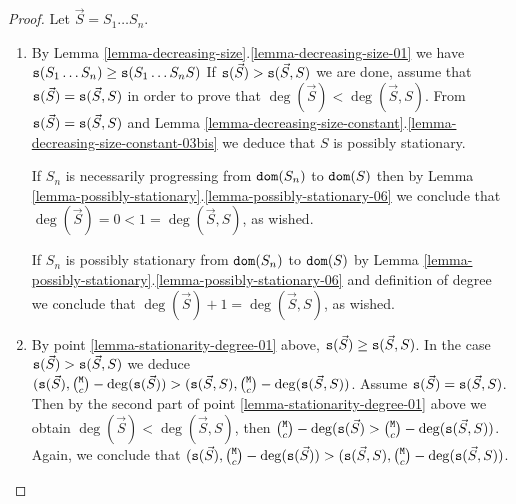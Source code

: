 \documentclass{lmcs}
\newtheorem{definition}[theorem]{Definition}
\begin{document}
\begin{proof}
Let $\vec{S} = S_1 \ldots S_n$.

\begin{enumerate}
\item
By Lemma \ref{lemma-decreasing-size}.\ref{lemma-decreasing-size-01}
we have ${\tt s}(S_1 \ldots S_n) \ge {\tt s}(S_1 \ldots S_n S)$ 
If ${\tt s}(\vec{S}) > {\tt s}(\vec{S},S)$ we are done, assume that 
${\tt s}(\vec{S}) = {\tt s}(\vec{S},S)$ in order to prove that $\deg(\vec{S}) < \deg(\vec{S},S)$.
From ${\tt s}(\vec{S}) = {\tt s}(\vec{S},S)$ and 
Lemma \ref{lemma-decreasing-size-constant}.\ref{lemma-decreasing-size-constant-03bis} 
we deduce that $S$ is possibly stationary. 

If $S_n$ is necessarily progressing from ${\tt dom}(S_n)$ to ${\tt dom}(S)$ then 
by Lemma \ref{lemma-possibly-stationary}.\ref{lemma-possibly-stationary-06}
we conclude that $\deg(\vec{S}) = 0 < 1 = \deg(\vec{S},S)$, as wished.

If $S_n$ is possibly stationary from ${\tt dom}(S_n)$ to ${\tt dom}(S)$ 
by Lemma \ref{lemma-possibly-stationary}.\ref{lemma-possibly-stationary-06}
and definition of degree we conclude that $\deg(\vec{S}) + 1 =  \deg(\vec{S},S)$, as wished.

\item
By point \ref{lemma-stationarity-degree-01} above, ${\tt s}(\vec{S}) \ge {\tt s}(\vec{S},S)$.
In the case ${\tt s}(\vec{S}) > {\tt s}(\vec{S},S)$ we deduce 
$
(\size(\vec{S}), \newton{\MaxInd}{c} - \deg(\size(\vec{S}))
>
(\size(\vec{S},S), \newton{\MaxInd}{c} - \deg(\size(\vec{S},S))
$.
Assume ${\tt s}(\vec{S}) = {\tt s}(\vec{S},S)$. Then by the second part of point 
\ref{lemma-stationarity-degree-01} above we obtain $\deg(\vec{S}) < \deg(\vec{S},S)$,
then $\newton{\MaxInd}{c} - \deg(\size(\vec{S}) > 
\newton{\MaxInd}{c} - \deg(\size(\vec{S},S))$. 
Again, we conclude that 
$
(\size(\vec{S}), \newton{\MaxInd}{c} - \deg(\size(\vec{S}))
>
(\size(\vec{S},S), \newton{\MaxInd}{c} - \deg(\size(\vec{S},S))
$.
\end{enumerate}
\end{proof}

% 
\end{document}
